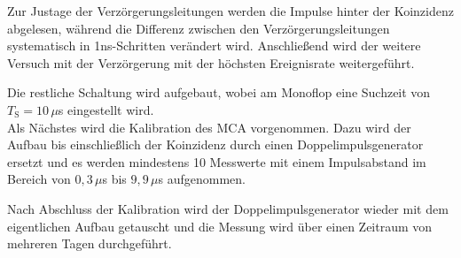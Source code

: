         Zur Justage der Verzörgerungsleitungen werden die Impulse hinter der Koinzidenz abgelesen, während die Differenz zwischen den Verzörgerungsleitungen systematisch in 1ns-Schritten verändert wird. Anschließend wird der weitere Versuch mit der Verzörgerung mit der höchsten Ereignisrate weitergeführt.

        Die restliche Schaltung wird aufgebaut, wobei am Monoflop eine Suchzeit von $T_{\text{S}} = 10 \, \mu$s eingestellt wird. \\
        Als Nächstes wird die Kalibration des MCA vorgenommen. Dazu wird der Aufbau bis einschließlich der Koinzidenz durch einen Doppelimpulsgenerator ersetzt und es werden mindestens 10 Messwerte mit einem Impulsabstand im Bereich von $0,3 \, \mu$s bis $9,9 \, \mu$s aufgenommen.

        Nach Abschluss der Kalibration wird der Doppelimpulsgenerator wieder mit dem eigentlichen Aufbau getauscht und die Messung wird über einen Zeitraum von mehreren Tagen durchgeführt. \cite{tu_dortmund_versuchsanleitung_2021-1}
